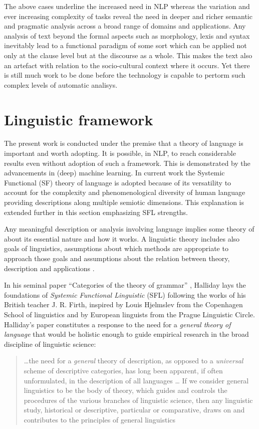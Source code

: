 The above cases underline the increased need in NLP whereas the variation and ever increasing complexity of tasks reveal the need in deeper and richer semantic and pragmatic analysis across a broad range of domains and applications. Any analysis of text beyond the formal aspects such as morphology, lexis and syntax inevitably lead to a functional paradigm of some sort which can be applied not only at the clause level but at the discourse as a whole. This makes the text also an artefact with relation to the socio-cultural context where it occurs. Yet there is still much work to be done before the technology is capable to pertorm such complex levels of automatic analisys.

\section{Linguistic framework}
\label{sec:framework}
The present work is conducted under the premise that a theory of language is important and worth adopting. It is possible, in NLP, to reach considerable results even without adoption of such a framework. This is demonstrated by the advancements in (deep) machine learning. In current work the Systemic Functional (SF) theory of language is adopted because of its versatility to account for the complexity and phenomenological diversity of human language providing descriptions along multiple semiotic dimensions. This explanation is extended further in this section emphasizing SFL strengths.
 
Any meaningful description or analysis involving language implies some theory of about its essential nature and how it works. A linguistic theory includes also goals of linguistics, assumptions about which methods are appropriate to approach those goals and assumptions about the relation between theory, description and applications \citep[3]{Fawcett2000}. 

In his seminal paper ``Categories of the theory of grammar'' \citep{Halliday61-orig}, Halliday lays the foundations of \textit{Systemic Functional Linguistic} (SFL) following the works of his British teacher J. R. Firth, inspired by Louis Hjelmslev \citep{Hjelmslev53} from the Copenhagen School of linguistics and by European linguists from the Prague Linguistic Circle. Halliday's paper constitutes a response to the need for a \textit{general theory of language} that would be holistic enough to guide empirical research in the broad discipline of linguistic science:
\begin{quotation}
    \dots the need for a \textit{general} theory of description, as opposed to a \textit{universal} scheme of descriptive categories, has long been apparent, if often unformulated, in the description of all languages \citep[54; emphasis in original]{Halliday57}
    \dots
    If we consider general linguistics to be the body of theory, which guides and controls the procedures of the various branches of linguistic science, then any linguistic study, historical or descriptive, particular or comparative, draws on and contributes to the principles of general linguistics \citep[55]{Halliday57}
\end{quotation} 

